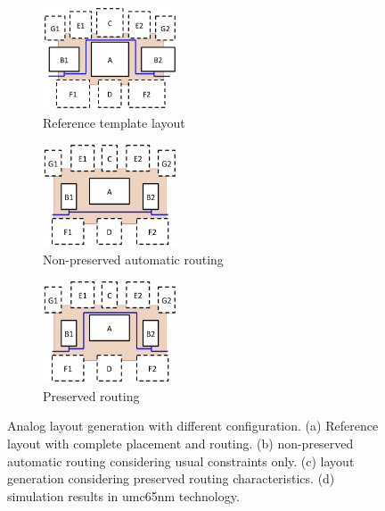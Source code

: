   \begin{figure}
    \centering
    \begin{subfigure}[t]{4cm}
    \includegraphics[width=4cm]{Fig/RoutingPreserv_a.eps}
    \caption{Reference template layout}
    \label{fig:RoutingPreserv_A}
    \end{subfigure}
    \begin{subfigure}[t]{4cm}
    \includegraphics[width=4cm]{Fig/RoutingPreserv_b.eps}
    \caption{Non-preserved automatic routing}
    \label{fig:RoutingPreserv_B}
    \end{subfigure}
    \begin{subfigure}[t]{4cm}
    \includegraphics[width=4cm]{Fig/RoutingPreserv_c.eps}
    \caption{Preserved routing}
    \label{fig:RoutingPreserv_C}
    \end{subfigure}
    
    \caption{Analog layout generation with different configuration. (a) Reference layout with complete placement and routing. (b) non-preserved automatic routing considering usual constraints only. (c) layout generation considering preserved routing characteristics. (d) simulation results in umc65nm technology.}
    \label{fig:RoutingPreserv}
  \end{figure}